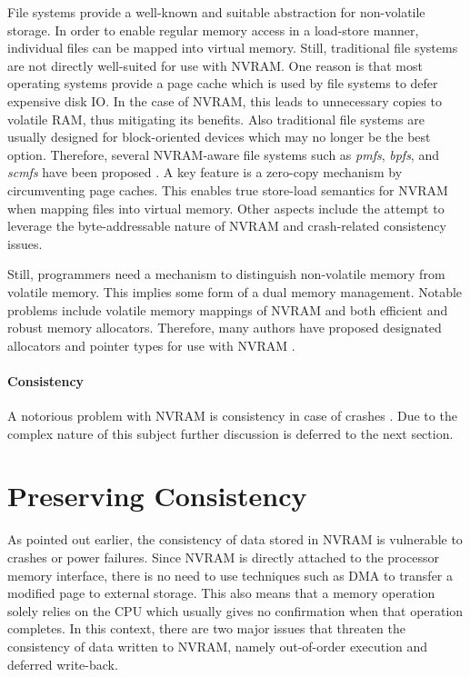 File systems provide a well-known and suitable abstraction for non-volatile
storage. In order to enable regular memory access in a load-store manner,
individual files can be mapped into virtual memory. Still, traditional file
systems are not directly well-suited for use with NVRAM. One reason is that most
operating systems provide a page cache which is used by file systems to defer
expensive disk IO. In the case of NVRAM, this leads to unnecessary copies to
volatile RAM, thus mitigating its benefits. Also traditional file systems are
usually designed for block-oriented devices which may no longer be the best
option. Therefore, several NVRAM-aware file systems such as \emph{pmfs},
\emph{bpfs}, and \emph{scmfs} have been proposed \cite{condit2009better,
wu2011scmfs, dulloor2014system}. A key feature is a zero-copy mechanism by
circumventing page caches. This enables true store-load semantics for NVRAM when
mapping files into virtual memory. Other aspects include the attempt to leverage
the byte-addressable nature of NVRAM and crash-related consistency issues.



Still, programmers need a mechanism to distinguish non-volatile memory from
volatile memory. This implies some form of a dual memory management. Notable
problems include volatile memory mappings of NVRAM and both efficient and robust
memory allocators. Therefore, many authors have proposed designated allocators
and pointer types for use with NVRAM \cite{wu2011scmfs, moraru2013consistent,
oukid2014sofort, schwalb2015nvm_malloc}.

\paragraph{Consistency}

A notorious problem with NVRAM is consistency in case of crashes
\cite{condit2009better, dulloor2014system, oukid2017data}. Due to the complex
nature of this subject further discussion is deferred to the next section.

\section{Preserving Consistency}

As pointed out earlier, the consistency of data stored in NVRAM is vulnerable to
crashes or power failures. Since NVRAM is directly attached to the processor
memory interface, there is no need to use techniques such as DMA to transfer a
modified page to external storage. This also means that a memory operation
solely relies on the CPU which usually gives no confirmation when that operation
completes. In this context, there are two major issues that threaten the
consistency of data written to NVRAM, namely out-of-order execution and deferred
write-back.

